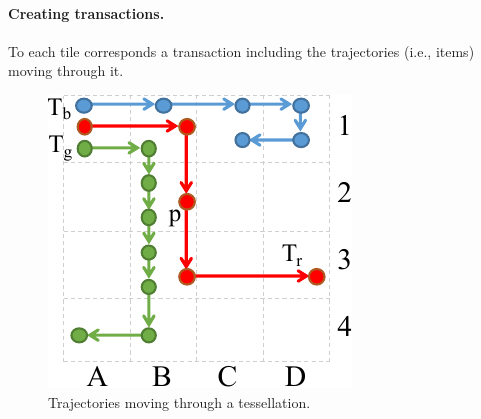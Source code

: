 \documentclass[
]{ceurart}
\begin{document}
\paragraph{Creating transactions.}
To each tile corresponds a transaction including the trajectories (i.e., items) moving through it.
%
\begin{figure}[t]
    \centering
    \includegraphics[scale=.6]{patterns2.pdf}
    \caption{Trajectories moving through a tessellation.}
    \label{fig:patterns2}
\end{figure}
\end{document}
